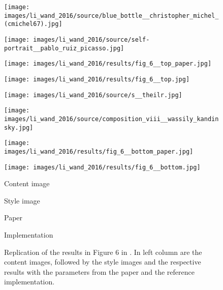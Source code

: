 \begin{figure}[H]
	\centering
	\begin{minipage}[t]{0.23\textwidth}
		\centering
		\texttt{[image: images/li\_wand\_2016/source/blue\_bottle\_\_christopher\_michel\_(cmichel67).jpg]}
	\end{minipage}
	\hfill%
	\begin{minipage}[t]{0.23\textwidth}
		\centering
		\texttt{[image: images/li\_wand\_2016/source/self-portrait\_\_pablo\_ruiz\_picasso.jpg]}
	\end{minipage}
	\hfill%
	\begin{minipage}[t]{0.23\textwidth}
		\centering
		\texttt{[image: images/li\_wand\_2016/results/fig\_6\_\_top\_paper.jpg]}
	\end{minipage}
	\hfill%
	\begin{minipage}[t]{0.23\textwidth}
		\centering
		\texttt{[image: images/li\_wand\_2016/results/fig\_6\_\_top.jpg]}
	\end{minipage}
	\hfill%
	\begin{minipage}[t]{0.23\textwidth}
		\centering
		\texttt{[image: images/li\_wand\_2016/source/s\_\_theilr.jpg]}
	\end{minipage}
	\hfill%
	\begin{minipage}[t]{0.23\textwidth}
		\centering
		\texttt{[image: images/li\_wand\_2016/source/composition\_viii\_\_wassily\_kandinsky.jpg]}
	\end{minipage}
	\hfill%
	\begin{minipage}[t]{0.23\textwidth}
		\centering
		\texttt{[image: images/li\_wand\_2016/results/fig\_6\_\_bottom\_paper.jpg]}
	\end{minipage}
	\hfill%
	\begin{minipage}[t]{0.23\textwidth}
		\centering
		\texttt{[image: images/li\_wand\_2016/results/fig\_6\_\_bottom.jpg]}
	\end{minipage}
	\hfill%
	\begin{minipage}[t]{0.23\textwidth}
	\centering
	Content image
	\end{minipage}
	\hfill%
	\begin{minipage}[t]{0.23\textwidth}
		\centering
		Style image
	\end{minipage}
	\hfill%
	\begin{minipage}[t]{0.23\textwidth}
		\centering
		Paper
	\end{minipage}
	\hfill%
	\begin{minipage}[t]{0.23\textwidth}
		\centering
		Implementation
	\end{minipage}
	\caption{Replication of the results in Figure 6 in \cite{LW2016}. In left column are the content images, followed by the style images and the respective results with the parameters from the paper and the reference implementation.}
	\label{fig:LW2016_fig6}
\end{figure}

